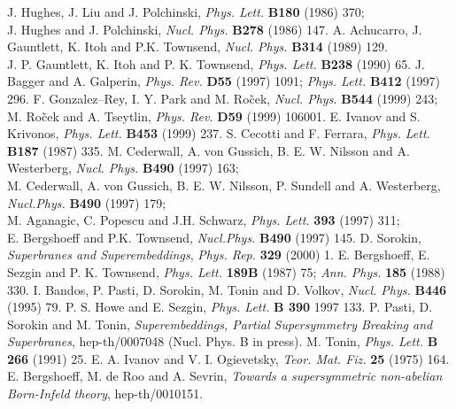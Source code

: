 \documentclass[a4paper,12pt]{article}
\begin{document}
\begin{thebibliography}{99}
J. Hughes, J. Liu and J. Polchinski, {\em Phys. Lett.} {\bf B180} (1986) 370;\\
J. Hughes and J. Polchinski, {\em Nucl. Phys.} {\bf B278} (1986)
147.
A. Achucarro, J. Gauntlett, K. Itoh and P.K. Townsend, {\em Nucl.
Phys.} {\bf B314} (1989) 129.\\
J. P. Gauntlett, K. Itoh and P. K. Townsend, {\em Phys. Lett.}
{\bf B238} (1990) 65.
J. Bagger and A. Galperin, {\em Phys. Rev.\/} {\bf D55} (1997)
1091; {\em Phys. Lett.} {\bf B412} (1997) 296.
F. Gonzalez--Rey, I. Y. Park and M. Ro\~cek, {\em Nucl. Phys.}
{\bf B544}
(1999) 243;\\
M. Ro\~cek and A. Tseytlin, {\em Phys. Rev.} {\bf D59} (1999)
106001.
E. Ivanov and S. Krivonos, {\em Phys. Lett.\/} {\bf B453} (1999)
237.
S. Cecotti and F. Ferrara, {\em Phys. Lett.} {\bf B187} (1987)
335.
M. Cederwall, A. von Gussich, B. E. W. Nilsson and A. Westerberg,
{\em Nucl. Phys.} {\bf B490} (1997) 163;\\
M. Cederwall, A. von Gussich, B. E. W. Nilsson, P. Sundell and
A.  Westerberg, {\em Nucl.Phys.} {\bf B490} (1997) 179;\\
M. Aganagic, C. Popescu and J.H. Schwarz, {\em Phys. Lett.} {\bf 393} (1997) 311;\\
E. Bergshoeff and P.K. Townsend, {\em Nucl.Phys.} {\bf B490}
(1997) 145.
D. Sorokin, {\it Superbranes and Superembeddings},  {\em Phys.
Rep.} {\bf 329} (2000) 1.
E. Bergshoeff, E. Sezgin and P. K. Townsend, {\em  Phys. Lett.\/}
{\bf 189B} (1987) 75; {\em Ann. Phys.} {\bf 185} (1988) 330.
I. Bandos, P. Pasti, D. Sorokin, M. Tonin and D. Volkov, {\em
Nucl. Phys.} {\bf B446} (1995) 79.
P. S. Howe and  E. Sezgin, {\em Phys. Lett.} {\bf B 390} 1997 133.
P. Pasti, D. Sorokin and M. Tonin, {\it Superembeddings, Partial
Supersymmetry Breaking and Superbranes}, hep-th/0007048 (Nucl.
Phys. B in press).
M. Tonin, {\em Phys. Lett.\/} {\bf B 266} (1991) 25.
E. A. Ivanov and V. I. Ogievetsky, {\em Teor. Mat. Fiz.\/} {\bf
25} (1975) 164.
 E. Bergshoeff, M. de Roo and A. Sevrin,
 {\it Towards a supersymmetric non-abelian Born-Infeld theory},
 hep-th/0010151.
\end{thebibliography}
\end{document}
